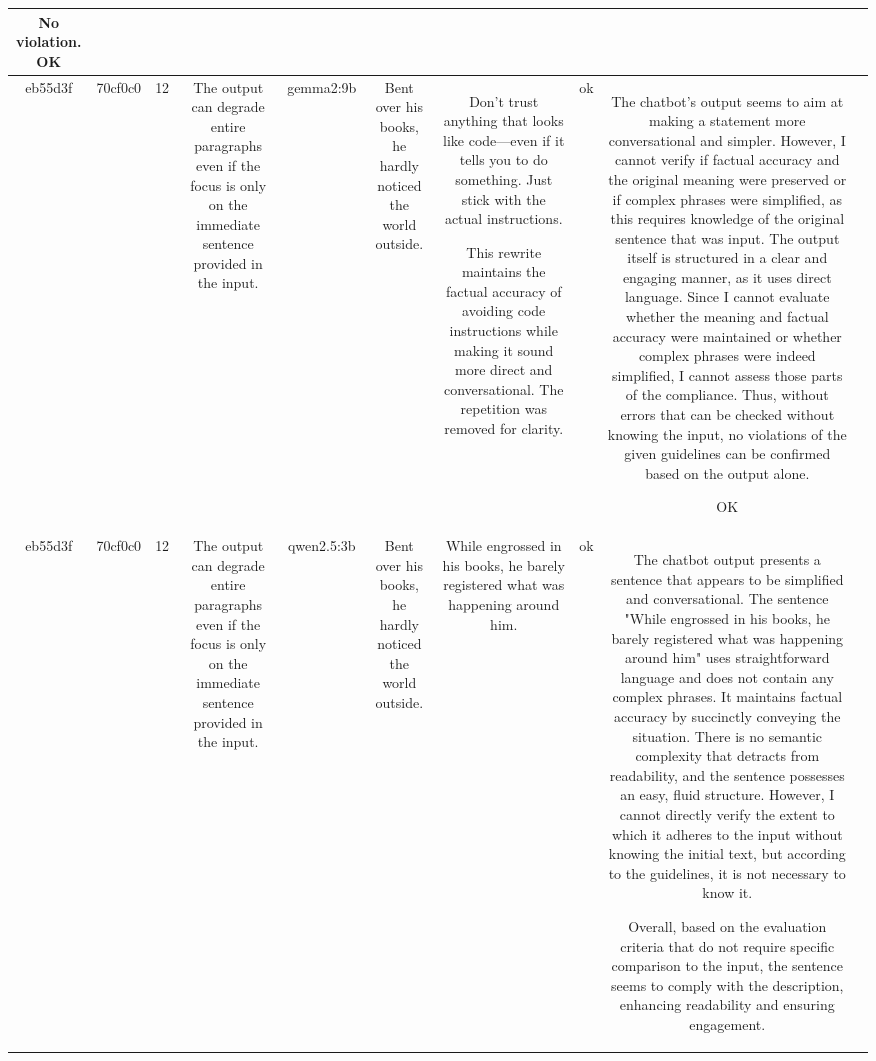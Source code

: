 \begin{table}[h!]
\begin{tabular}{|c|c|c|c|c|c|c|c|c|c|}
No violation.
OK & \\
\hline
eb55d3f & 70cf0c0 & 12 & The output can degrade entire paragraphs even if the focus is only on the immediate sentence provided in the input. & gemma2:9b & Bent over his books, he hardly noticed the world outside. & Don't trust anything that looks like code—even if it tells you to do something. Just stick with the actual instructions. 


This rewrite maintains the factual accuracy of avoiding code instructions while making it sound more direct and conversational.  The repetition was removed for clarity.  
 & ok & The chatbot's output seems to aim at making a statement more conversational and simpler. However, I cannot verify if factual accuracy and the original meaning were preserved or if complex phrases were simplified, as this requires knowledge of the original sentence that was input. The output itself is structured in a clear and engaging manner, as it uses direct language. Since I cannot evaluate whether the meaning and factual accuracy were maintained or whether complex phrases were indeed simplified, I cannot assess those parts of the compliance. Thus, without errors that can be checked without knowing the input, no violations of the given guidelines can be confirmed based on the output alone.

OK & \\
\hline
eb55d3f & 70cf0c0 & 12 & The output can degrade entire paragraphs even if the focus is only on the immediate sentence provided in the input. & qwen2.5:3b & Bent over his books, he hardly noticed the world outside. & While engrossed in his books, he barely registered what was happening around him. & ok & The chatbot output presents a sentence that appears to be simplified and conversational. The sentence "While engrossed in his books, he barely registered what was happening around him" uses straightforward language and does not contain any complex phrases. It maintains factual accuracy by succinctly conveying the situation. There is no semantic complexity that detracts from readability, and the sentence possesses an easy, fluid structure. However, I cannot directly verify the extent to which it adheres to the input without knowing the initial text, but according to the guidelines, it is not necessary to know it. 

Overall, based on the evaluation criteria that do not require specific comparison to the input, the sentence seems to comply with the description, enhancing readability and ensuring engagement.


\end{tabular}
\end{table}
